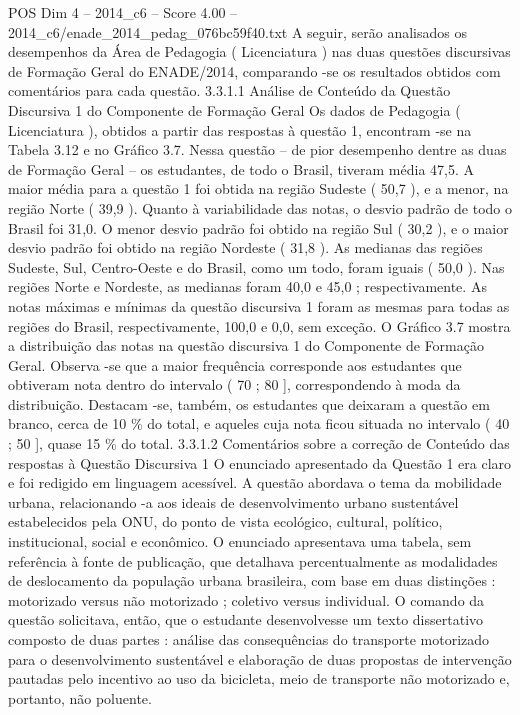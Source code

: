 \begin{textsample}{POS Dim 4 – 2014\_c6 – Score 4.00 – 2014\_c6/enade\_2014\_pedag\_076bc59f40.txt}
A seguir, serão analisados os desempenhos da Área de Pedagogia ( Licenciatura ) nas duas questões discursivas de Formação Geral do ENADE/2014, comparando -se os resultados obtidos com comentários para cada questão. 3.3.1.1 Análise de Conteúdo da Questão Discursiva 1 do Componente de Formação Geral Os dados de Pedagogia ( Licenciatura ), obtidos a partir das respostas à questão 1, encontram -se na Tabela 3.12 e no Gráfico 3.7.
Nessa questão – de pior desempenho dentre as duas de Formação Geral – os estudantes, de todo o Brasil, tiveram média 47,5.
A maior média para a questão 1 foi obtida na região Sudeste ( 50,7 ), e a menor, na região Norte ( 39,9 ).
Quanto à variabilidade das notas, o desvio padrão de todo o Brasil foi 31,0.
O menor desvio padrão foi obtido na região Sul ( 30,2 ), e o maior desvio padrão foi obtido na região Nordeste ( 31,8 ).
As medianas das regiões Sudeste, Sul, Centro-Oeste e do Brasil, como um todo, foram iguais ( 50,0 ).
Nas regiões Norte e Nordeste, as medianas foram 40,0 e 45,0 ; respectivamente.
As notas máximas e mínimas da questão discursiva 1 foram as mesmas para todas as regiões do Brasil, respectivamente, 100,0 e 0,0, sem exceção.
O Gráfico 3.7 mostra a distribuição das notas na questão discursiva 1 do Componente de Formação Geral.
Observa -se que a maior frequência corresponde aos estudantes que obtiveram nota dentro do intervalo ( 70 ; 80 ], correspondendo à moda da distribuição.
Destacam -se, também, os estudantes que deixaram a questão em branco, cerca de 10 \% do total, e aqueles cuja nota ficou situada no intervalo ( 40 ; 50 ], quase 15 \% do total. 3.3.1.2 Comentários sobre a correção de Conteúdo das respostas à Questão Discursiva 1 O enunciado apresentado da Questão 1 era claro e foi redigido em linguagem acessível.
A questão abordava o tema da mobilidade urbana, relacionando -a aos ideais de desenvolvimento urbano sustentável estabelecidos pela ONU, do ponto de vista ecológico, cultural, político, institucional, social e econômico.
O enunciado apresentava uma tabela, sem referência à fonte de publicação, que detalhava percentualmente as modalidades de deslocamento da população urbana brasileira, com base em duas distinções : motorizado versus não motorizado ; coletivo versus individual.
O comando da questão solicitava, então, que o estudante desenvolvesse um texto dissertativo composto de duas partes : análise das consequências do transporte motorizado para o desenvolvimento sustentável e elaboração de duas propostas de intervenção pautadas pelo incentivo ao uso da bicicleta, meio de transporte não motorizado e, portanto, não poluente.

\end{textsample}
